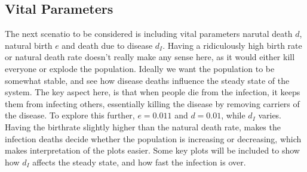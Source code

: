 \subsection{Vital Parameters}
The next scenatio to be considered is including vital parameters narutal death $d$, natural birth $e$ and death due to disease $d_I$.
Having a ridiculously high birth rate or natural death rate doesn't really make any sense here, as it would either kill everyone or explode the population.
Ideally we want the population to be somewhat stable, and see how disease deaths influence the steady state of the system.
The key aspect here, is that when people die from the infection, it keeps them from infecting others, essentially killing the disease by removing carriers of the disease.
To explore this further, $e=0.011$ and $d=0.01$, while $d_I$ varies. 
Having the birthrate slightly higher than the natural death rate, makes the infection deaths decide whether the population is increasing or decreasing, which makes interpretation of the plots easier.
Some key plots will be included to show how $d_I$ affects the steady state, and how fast the infection is over.


